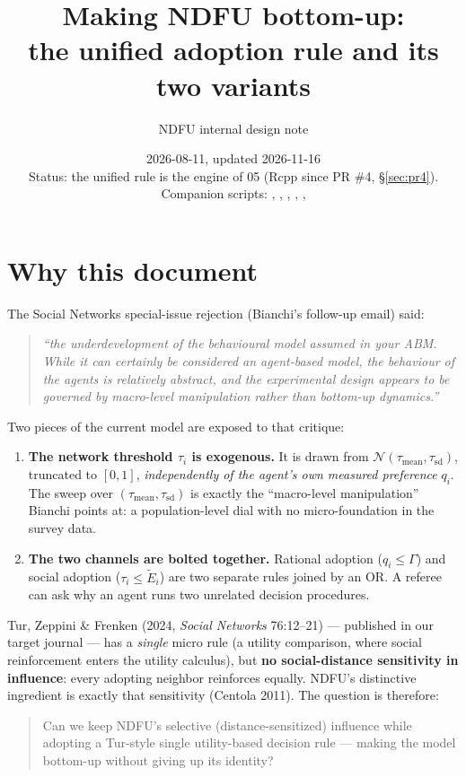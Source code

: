 \documentclass[11pt,a4paper]{article}
\title{Making NDFU bottom-up:\\ the unified adoption rule and its two variants}
\author{NDFU internal design note}
\date{2026-08-11, updated 2026-11-16 \\[4pt]
\normalsize Status: the unified rule is the engine of 05 (Rcpp since PR \#4, \S\ref{sec:pr4}).\\
\normalsize Companion scripts: \code{02\_network\_calibrated.R}, \code{05\_unified\_diffusion\_sweep.R},
\code{06*}, \code{07}, \code{09}, \code{10}}
\newcommand{\Ee}{\tilde{E}}                 %
\begin{document}
\maketitle
\tableofcontents

\section{Why this document}

The Social Networks special-issue rejection (Bianchi's follow-up email) said:

\begin{quote}\itshape
``the underdevelopment of the behavioural model assumed in your ABM. While it can certainly
be considered an agent-based model, the behaviour of the agents is relatively abstract, and
the experimental design appears to be governed by macro-level manipulation rather than
bottom-up dynamics.''
\end{quote}

Two pieces of the current model are exposed to that critique:

\begin{enumerate}
  \item \textbf{The network threshold $\tau_i$ is exogenous.} It is drawn from
    $\mathcal{N}(\tau_{\text{mean}}, \tau_{\text{sd}})$, truncated to $[0,1]$,
    \emph{independently of the agent's own measured preference} $q_i$. The sweep over
    $(\tau_{\text{mean}}, \tau_{\text{sd}})$ is exactly the ``macro-level manipulation''
    Bianchi points at: a population-level dial with no micro-foundation in the survey data.
  \item \textbf{The two channels are bolted together.} Rational adoption ($q_i \le \Gamma$)
    and social adoption ($\tau_i \le \Ee_i$) are two separate rules joined by an OR. A
    referee can ask why an agent runs two unrelated decision procedures.
\end{enumerate}

Tur, Zeppini \& Frenken (2024, \emph{Social Networks} 76:12--21) --- published in our
target journal --- has a \emph{single} micro rule (a utility comparison, where social
reinforcement enters the utility calculus), but \textbf{no social-distance sensitivity in
influence}: every adopting neighbor reinforces equally. NDFU's distinctive ingredient is
exactly that sensitivity (Centola 2011). The question is therefore:

\begin{quote}
Can we keep NDFU's selective (distance-sensitized) influence while adopting a Tur-style
single utility-based decision rule --- making the model bottom-up without giving up its
identity?
\end{quote}
\end{document}

